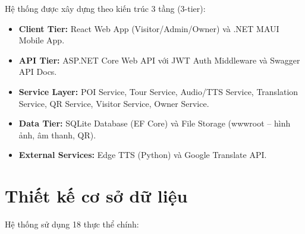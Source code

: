 \documentclass[a4paper,13pt]{report}
\begin{document}
Hệ thống được xây dựng theo kiến trúc 3 tầng (3-tier):

\begin{itemize}[nosep]
  \item \textbf{Client Tier:} React Web App (Visitor/Admin/Owner) và .NET MAUI Mobile App.
  \item \textbf{API Tier:} ASP.NET Core Web API với JWT Auth Middleware và Swagger API Docs.
  \item \textbf{Service Layer:} POI Service, Tour Service, Audio/TTS Service, Translation Service, QR Service, Visitor Service, Owner Service.
  \item \textbf{Data Tier:} SQLite Database (EF Core) và File Storage (wwwroot -- hình ảnh, âm thanh, QR).
  \item \textbf{External Services:} Edge TTS (Python) và Google Translate API.
\end{itemize}

\section{Thiết kế cơ sở dữ liệu}

Hệ thống sử dụng 18 thực thể chính:
\end{document}
